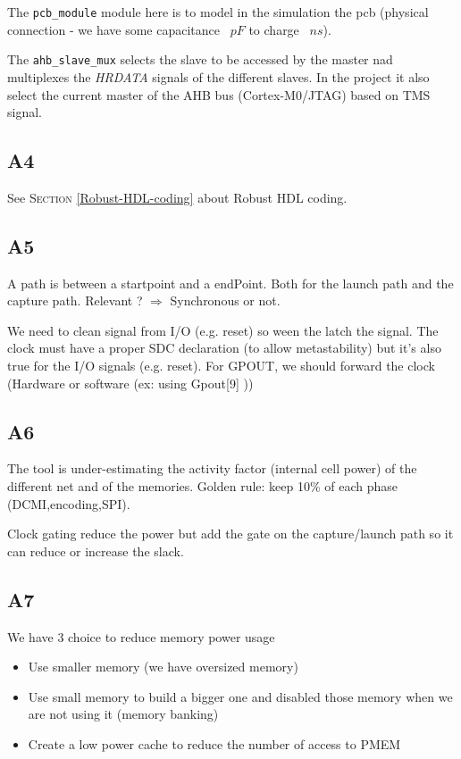 The \texttt{pcb\_module}  module here is to model in the simulation the pcb (physical connection - we have some capacitance ~\(pF\) to charge ~\(ns\)).

The \texttt{ahb\_slave\_mux} selects the slave to be accessed by the master nad multiplexes the \textit{HRDATA} signals of the different slaves. In the project it also select the current master of the AHB bus (Cortex-M0/JTAG) based on TMS signal.


\subsection{A4}
See \textsc{Section} \ref{Robust-HDL-coding}  about Robust HDL coding.


\subsection{A5}
A path is between a startpoint and a endPoint. Both for the launch path and the capture path. Relevant ? \(\Rightarrow\) Synchronous or not.

We need to clean signal from I/O (e.g. reset) so ween the latch the signal. The clock must have a proper SDC declaration (to allow metastability) but it's also true for the I/O signals (e.g. reset). For GPOUT, we should forward the clock (Hardware or software (ex: using Gpout[9] ))


\subsection{A6}

The tool is under-estimating the activity factor (internal cell power) of the different net and of the memories. Golden rule: keep 10\% of each phase (DCMI,encoding,SPI). 

Clock gating reduce the power but add the gate on the capture/launch path so it can reduce  or increase the slack.

\subsection{A7}
We have 3 choice to reduce memory power usage
\begin{itemize}
  \item Use smaller memory (we have oversized memory)
  \item Use small memory to build a bigger one and disabled those memory when we are not using it (memory banking)
  \item Create a low power cache to reduce the number of access to PMEM
\end{itemize}

